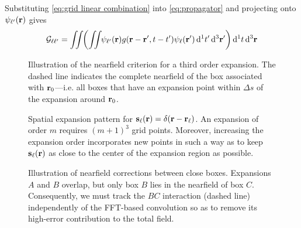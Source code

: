 Substituting \cref{eq:grid linear combination} into \cref{eq:propagator} and projecting onto $\psi_{\ell'}(\vb{r})$ gives
\begin{equation}
  \mathcal{G}_{\ell \ell'} = \iint_{} \kern0.1em \qty( \iint_{} \kern0.1em \psi_{\ell'}(\vb{r}) g(\vb{r} - \vb{r}', t - t') \psi_\ell(\vb{r}') \dd[1]{t'} \dd[3]{\vb{r}'} ) \dd[1]{t} \dd[3]{\vb{r}}
\end{equation}

\begin{figure}
  \centering
  
  \caption{\label{fig:nearfield criterion}Illustration of the nearfield criterion for a third order expansion.
    The dashed line indicates the complete nearfield of the box associated with \textcolor{cbblue}{$\vb{r}_0$}---i.e. all boxes that have an expansion point within $\Delta s$ of the expansion around \textcolor{cbblue}{$\vb{r}_0$}.
  }
\end{figure}

\begin{figure}
  \centering
  \caption{\label{fig:expansion grid}Spatial expansion pattern for $\vb{s}_\ell(\vb{r}) = \delta(\vb{r} - \vb{r}_\ell)$.
    An expansion of order $m$ requires $(m + 1)^3$ grid points.
    Moreover, increasing the expansion order incorporates new points in such a way as to keep $\vb{s}_\ell(\vb{r})$ as close to the center of the expansion region as possible.
  }
\end{figure}

\begin{figure}
  \centering
  \caption{\label{fig:nearfield correction}Illustration of nearfield corrections between close boxes.
    Expansions $A$ and $B$ overlap, but only box $B$ lies in the nearfield of box $C$.
    Consequently, we must track the $BC$ interaction (dashed line) independently of the FFT-based convolution so as to remove its high-error contribution to the total field.
  }
\end{figure}
